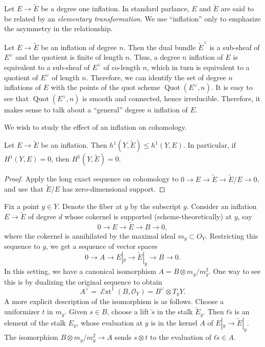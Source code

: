 \documentclass[11 pt]{amsart}
\DeclareMathOperator{\Quot}{Quot}
\renewcommand{\O}{{\mathcal O}}
\DeclareMathOperator{\shExt}{\mathscr{E}xt}
\numberwithin{equation}{section}
\begin{document}
  \begin{remark}
    Let $E \to \widetilde E$ be a degree one inflation.
    In standard parlance, $E$ and $\widetilde E$ are said to be related by an \emph{elementary transformation}.
    We use ``inflation'' only to emphasize the asymmetry in the relationship.
  \end{remark}


Let $E \to \widetilde E$ be an inflation of degree $n$.
Then the dual bundle $\widetilde E^\vee$ is a sub-sheaf of $E^\vee$ and the quotient is finite of length $n$.
Thus, a degree $n$ inflation of $E$ is equivalent to a sub-sheaf of $E^\vee$ of co-length $n$, which in turn is equivalent to a quotient of $E^\vee$ of length $n$.
Therefore, we can identify the set of degree $n$ inflations of $E$ with the points of the quot scheme $\Quot(E^\vee, n)$.
It is easy to see that $\Quot(E^\vee, n)$ is smooth and connected, hence irreducible.
Therefore, it makes sense to talk about a ``general'' degree $n$ inflation of $E$.

We wish to study the effect of an inflation on cohomology.
\begin{proposition}\label{prop:inf_inf}
  Let $E \to \widetilde E$ be an inflation.
  Then $h^1(Y, \widetilde E) \leq h^1(Y, E)$.
  In particular, if $H^1(Y, E) = 0$, then $H^1(Y, \widetilde E) = 0$.
\end{proposition}
\begin{proof}
  Apply the long exact sequence on cohomology to $0 \to E \to \widetilde E \to \widetilde E/E \to 0$, and use that $\widetilde E/E$ has zero-dimensional support.
\end{proof}

Fix a point $y \in Y$.
Denote the fiber at $y$ by the subscript $y$.
Consider an inflation $E \to \widetilde E$ of degree $d$ whose cokernel is supported (scheme-theoretically) at $y$,
say
\begin{equation}\label{eq:inforiginal}
  0 \to E \to \widetilde E \to B \to 0,
\end{equation}
where the cokernel is annihilated by the maximal ideal $m_y \subset O_Y$.
Restricting this sequence to $y$, we get a sequence of vector spaces
\[ 0 \to A \to E|_y \to \widetilde E|_y \to B \to 0.\]
In this setting, we have a canonical isomorphism $A = B \otimes m_y/m_y^2$.
One way to see this is by dualizing the original sequence to obtain
\[A^\vee = \shExt^1(B, \O_Y) = B^\vee \otimes T_yY.\]
A more explicit description of the isomorphism is as follows.
Choose a uniformizer $t$ in $m_y$.
Given $s \in B$, choose a lift $\widetilde s$ in the stalk $\widetilde E_y$.
Then $t  \widetilde s$ is an element of the stalk $E_y$, whose evaluation at $y$ is in the kernel $A$ of $E|_y \to \widetilde E|_y$.
The isomorphism $B \otimes m_y / m_y^2 \to A$ sends $s \otimes t$ to the evaluation of $t \widetilde s \in A$.
\end{document}
